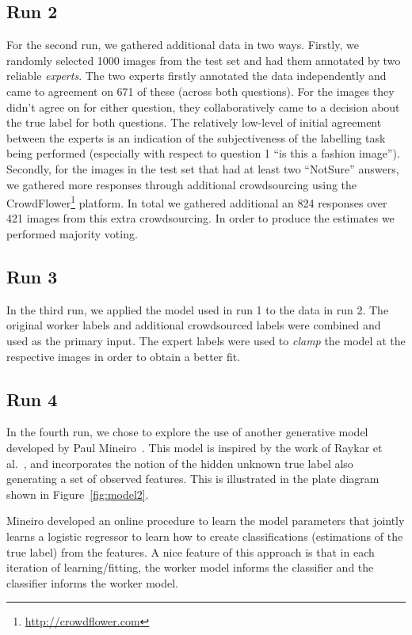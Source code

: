 \documentclass{../acm_proc_article-me11_tweaked}
\begin{document}
\subsection{Run 2}
For the second run, we gathered additional data in two ways. Firstly, we randomly selected 1000 images from the test set and had them annotated by two reliable \emph{experts}. The two experts firstly annotated the data independently and came to agreement on 671 of these (across both questions). For the images they didn't agree on for either question, they collaboratively came to a decision about the true label for both questions. The relatively low-level of initial agreement between the experts is an indication of the subjectiveness of the labelling task being performed (especially with respect to question 1 ``is this a fashion image''). Secondly, for the images in the test set that had at least two ``NotSure'' answers, we gathered more responses through additional crowdsourcing using the CrowdFlower\footnote{\url{http://crowdflower.com}} platform. In total we gathered additional an 824 responses over 421 images from this extra crowdsourcing. In order to produce the estimates we performed majority voting. 

\subsection{Run 3}
In the third run, we applied the model used in run 1 to the data in run 2. The original worker labels and additional crowdsourced labels were combined and used as the primary input. The expert labels were used to \emph{clamp} the model at the respective images in order to obtain a better fit.

\subsection{Run 4}
In the fourth run, we chose to explore the use of another generative model developed by Paul Mineiro~\cite{Mineiro20111116}. This model is inspired by the work of Raykar et al.~\cite{Raykar:2010:LC:1756006.1859894}, and incorporates the notion of the hidden unknown true label also generating a set of observed features. This is illustrated in the plate diagram shown in Figure~\ref{fig:model2}.

Mineiro developed an online procedure to learn the model parameters that jointly learns a logistic regressor to learn how to create classifications (estimations of the true label) from the features. A nice feature of this approach is that in each iteration of learning/fitting, the worker model informs the classifier and the classifier informs the worker model.
\end{document}
